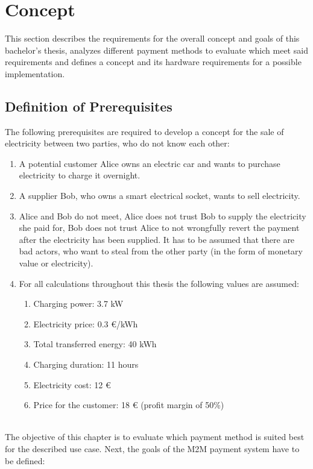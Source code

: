 \section{Concept}
This section describes the requirements for the overall concept and goals of this bachelor’s thesis, analyzes different payment methods to evaluate which meet said requirements and defines a concept and its hardware requirements for a possible implementation.
\\
\subsection{Definition of Prerequisites}

The following prerequisites are required to develop a concept for the sale of electricity between two parties, who do not know each other:
\begin{enumerate}
    \item A potential customer Alice owns an electric car and wants to purchase electricity to charge it overnight.
    \item A supplier Bob, who owns a smart electrical socket, wants to sell electricity.
    \item Alice and Bob do not meet, Alice does not trust Bob to supply the electricity she paid for, Bob does not trust Alice to not wrongfully revert the payment after the electricity has been supplied.
    It has to be assumed that there are bad actors, who want to steal from the other party (in the form of monetary value or electricity).
    \item For all calculations throughout this thesis the following values are assumed:
    \begin{enumerate}
        \item Charging power: 3.7 kW
        \item Electricity price: 0.3 \euro/kWh
        \item Total transferred energy: 40 kWh
        \item Charging duration: 11 hours
        \item Electricity cost: 12 \euro
        \item Price for the customer: 18 \euro{} (profit margin of 50\%)
    \end{enumerate}
\end{enumerate}
\leavevmode
\\
The objective of this chapter is to evaluate which payment method is suited best for the described use case.
Next, the goals of the M2M payment system have to be defined:

